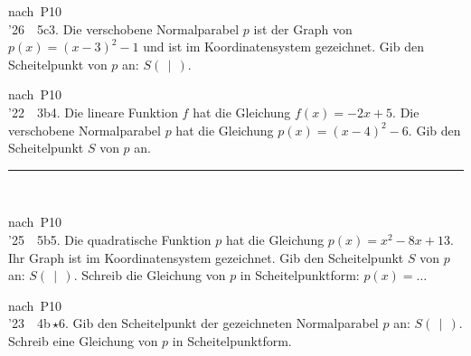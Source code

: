 \documentclass[11pt]{article}
\newlength{\gEin}\setlength{\gEin}{0pt}
\newcommand{\gzwei}[2]{\par\smallskip\noindent\sbox{\gbox}{#1}%
  \setlength{\gLinks}{\dimexpr0.5\textwidth-\gEin-\mbpfnr\relax}%
  \ifdim\wd\gbox>\dimexpr\gLinks-4mm\relax
    \usebox{\gbox}\par\smallskip\noindent\begin{minipage}{\linewidth}#2\end{minipage}%
  \else
    \begin{minipage}[t]{\gLinks}\vspace{0pt}\usebox{\gbox}\end{minipage}%
    \begin{minipage}[t]{\dimexpr\linewidth-\gLinks\relax}\vspace{0pt}\raggedright #2\end{minipage}%
  \fi\par}
\def\gkopfnach{}
\newcommand{\gkopfvor}[1]{\gdef\gkopfnach{#1}}
\newcommand{\karo}[1]{\par\smallskip\noindent\begin{tikzpicture}
  \clip (0,0) rectangle ({\linewidth-1mm},{#1*10mm});
  \draw[black!16,line width=0.3pt,step=5mm] (0,0) grid ({\linewidth},{#1*10mm});
  \end{tikzpicture}\par}
\newcommand{\linie}[1]{\,{\color{black!45}\rule[-1pt]{#1}{0.4pt}}\,}
\newcommand{\pkt}{\textperiodcentered{}}
\begin{document}
\gkopfvor{\pfstufekopf{Scheitelpunkt angeben}{\pfjahre{26 \pkt{} 22}{21 \pkt{} 20 \pkt{} 18 \pkt{} 17}}}
\begin{pfaufg}{nach~P10\\’26~\pkt{}~5c}{3.}{}
Die verschobene Normalparabel $p$ ist der Graph von $p(x) = (x-3)^2 - 1$ und ist im Koordinatensystem gezeichnet. Gib den Scheitelpunkt von $p$ an: $S(\ \ |\ \ )$.
\gzwei{\begin{ksys}[xmin=-1,xmax=6,ymin=-2,ymax=5,karo=0.5]\parabel{1}{3}{-1}{p}\end{ksys}}{\karo{2}}
\end{pfaufg}
\begin{pfaufg}{nach~P10\\’22~\pkt{}~3b}{4.}{}
Die lineare Funktion $f$ hat die Gleichung $f(x) = -2x + 5$. Die verschobene Normalparabel $p$ hat die Gleichung $p(x) = (x-4)^2 - 6$. Gib den Scheitelpunkt $S$ von $p$ an.
\hfill\linie{30mm}
\end{pfaufg}

\gkopfvor{\pfstufekopf{Gleichung in Scheitelpunktform}{\pfjahre{25 \pkt{} 23}{20 \pkt{} 18 \pkt{} 17 \pkt{} 16 \pkt{} 15}}}
\begin{pfaufg}{nach~P10\\’25~\pkt{}~5b}{5.}{}
Die quadratische Funktion $p$ hat die Gleichung $p(x) = x^2 - 8x + 13$. Ihr Graph ist im Koordinatensystem gezeichnet. Gib den Scheitelpunkt $S$ von $p$ an: $S(\ \ |\ \ )$. Schreib die Gleichung von $p$ in Scheitelpunktform: $p(x) = \ldots$
\gzwei{\begin{ksys}[xmin=-1,xmax=8,ymin=-4,ymax=4,karo=0.5]\parabel{1}{4}{-3}{p}\end{ksys}}{\karo{3}}
\end{pfaufg}
\begin{pfaufg}{nach~P10\\’23~\pkt{}~4b\,$\star$}{6.}{}
Gib den Scheitelpunkt der gezeichneten Normalparabel $p$ an: $S(\ \ |\ \ )$. Schreib eine Gleichung von $p$ in Scheitelpunktform.
\gzwei{\begin{ksys}[xmin=-3,xmax=5,ymin=-2,ymax=6,karo=0.5]\parabel{-1}{1}{5}{p}\end{ksys}}{\karo{3}}
\end{pfaufg}
\end{document}
